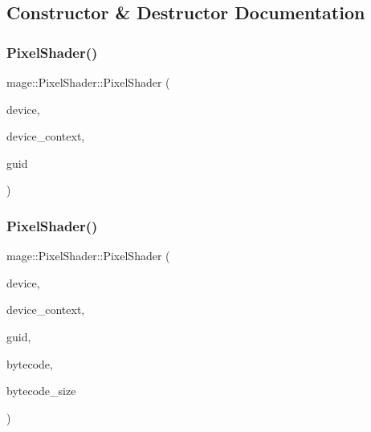 \subsection{Constructor \& Destructor Documentation}
\hypertarget{classmage_1_1_pixel_shader_abf1a5e4a5a550553aea1427e80cd9403}{}\label{classmage_1_1_pixel_shader_abf1a5e4a5a550553aea1427e80cd9403} 
\subsubsection{\texorpdfstring{Pixel\+Shader()}{PixelShader()}\hspace{0.1cm}{\footnotesize\ttfamily [1/4]}}
{\footnotesize\ttfamily mage\+::\+Pixel\+Shader\+::\+Pixel\+Shader (\begin{DoxyParamCaption}\item[{I\+D3\+D11\+Device2 $\ast$}]{device,  }\item[{I\+D3\+D11\+Device\+Context2 $\ast$}]{device\+\_\+context,  }\item[{const wstring \&}]{guid }\end{DoxyParamCaption})}

\hypertarget{classmage_1_1_pixel_shader_a0278c67883cbf9259ea83e7f6c8162a2}{}\label{classmage_1_1_pixel_shader_a0278c67883cbf9259ea83e7f6c8162a2} 
\subsubsection{\texorpdfstring{Pixel\+Shader()}{PixelShader()}\hspace{0.1cm}{\footnotesize\ttfamily [2/4]}}
{\footnotesize\ttfamily mage\+::\+Pixel\+Shader\+::\+Pixel\+Shader (\begin{DoxyParamCaption}\item[{I\+D3\+D11\+Device2 $\ast$}]{device,  }\item[{I\+D3\+D11\+Device\+Context2 $\ast$}]{device\+\_\+context,  }\item[{const wstring \&}]{guid,  }\item[{const void $\ast$}]{bytecode,  }\item[{S\+I\+Z\+E\+\_\+T}]{bytecode\+\_\+size }\end{DoxyParamCaption})}

